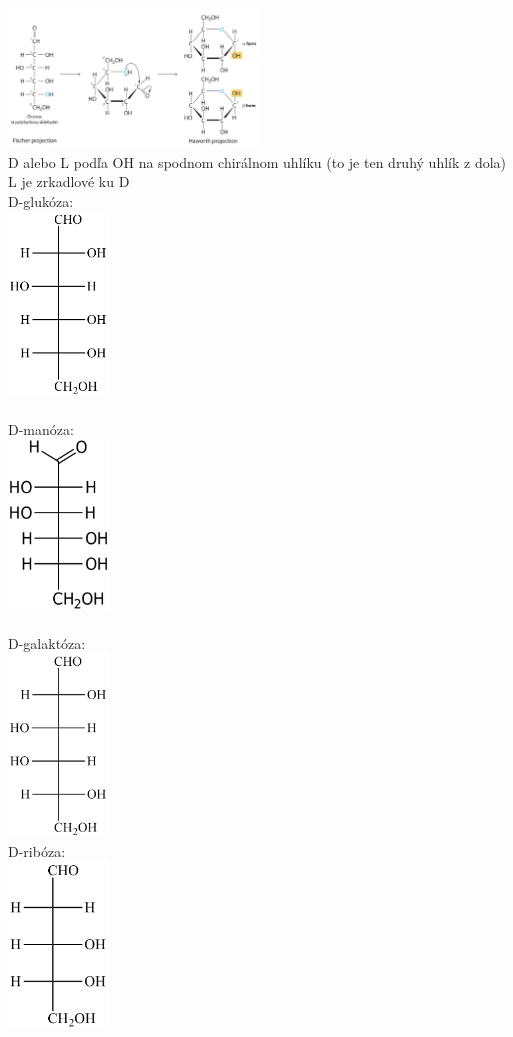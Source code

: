 \includegraphics[width=0.5\textwidth]{images/fischer_to_haworth_sacharidy}
\\
D alebo L podľa OH na spodnom chirálnom uhlíku (to je ten druhý uhlík z dola)\\
L je zrkadlové ku D\\
\tab D-glukóza:\\
\includegraphics[width=0.2\textwidth]{images/glucose}\\
\\
\tab D-manóza:\\
\includegraphics[width=0.2\textwidth]{images/mannose}\\
\\
\tab D-galaktóza:\\
\includegraphics[width=0.2\textwidth]{images/galactose}\\
\tab D-ribóza:\\
\includegraphics[width=0.2\textwidth]{images/ribose}\\
